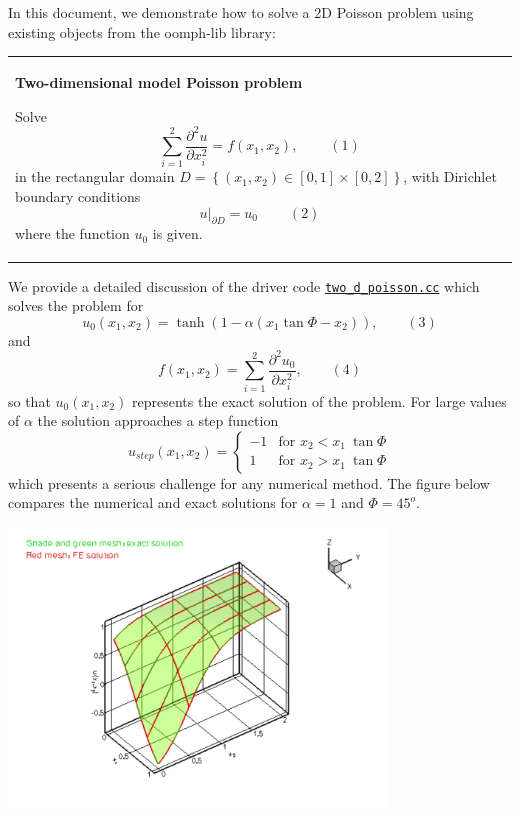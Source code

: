 In this document, we demonstrate how to solve a 2D Poisson problem using existing objects from the {\ttfamily oomph-\/lib} library\+: \begin{center} \tabulinesep=1mm
\begin{longtabu} spread 0pt [c]{*{1}{|X[-1]}|}
\hline
\begin{center} {\bfseries Two-\/dimensional model Poisson problem} \end{center}  Solve \[ \sum_{i=1}^2 \frac{\partial^2u}{\partial x_i^2} = f(x_1,x_2), \ \ \ \ \ \ \ \ \ \ (1) \] in the rectangular domain $D =\left\{ (x_1,x_2) \in [0,1] \times [0,2]\right\}$, with Dirichlet boundary conditions \[ \left. u\right|_{\partial D}=u_0 \ \ \ \ \ \ \ \ \ \ (2) \] where the function $ u_0 $ is given.   \\
\end{longtabu}
\end{center} 

We provide a detailed discussion of the driver code \href{../../../../demo_drivers/poisson/two_d_poisson/two_d_poisson.cc}{\tt two\+\_\+d\+\_\+poisson.\+cc} which solves the problem for \[ u_0(x_1,x_2) = \tanh(1-\alpha(x_1 \tan\Phi - x_2)), \ \ \ \ \ \ \ \ \ (3) \] and \[ f(x_1,x_2) = \sum_{i=1}^2 \frac{\partial^2 u_0}{\partial x_i^2}, \ \ \ \ \ \ \ \ \ (4) \] so that $u_0(x_1,x_2) $ represents the exact solution of the problem. For large values of $ \alpha $ the solution approaches a step function \[ u_{step}(x_1,x_2) = \left\{ \begin{array}{rl} -1 & \mbox {for $x_2 < x_1 \ \tan\Phi$} \\ 1 & \mbox {for $x_2 > x_1 \ \tan\Phi$} \end{array} \right. \] which presents a serious challenge for any numerical method. The figure below compares the numerical and exact solutions for $ \alpha = 1 $ and $\Phi = 45^o$.

 
\begin{DoxyImage}
\includegraphics[width=0.75\textwidth]{two_d_poisson_soln}
\end{DoxyImage}




